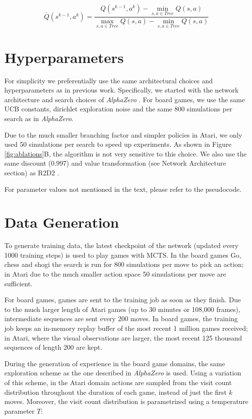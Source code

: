 \documentclass{article}
\newcommand{\alphazero}{\emph{AlphaZero}}
\begin{document}
\begin{appendices}
\begin{equation}
\overline{Q}(s^{k-1}, a^k) = \frac{Q(s^{k-1}, a^k) - \min_{s, a \in Tree}Q(s, a)}{\max_{s,a \in Tree} Q(s, a) - \min_{s,a \in Tree} Q(s, a)}
\end{equation}

\section{Hyperparameters}

For simplicity we preferentially use the same architectural choices and hyperparameters as in previous work. Specifically, we started with the network architecture and search choices of \alphazero{} \cite{Silver18AZ}. For board games, we use the same UCB constants, dirichlet exploration noise and the same 800 simulations per search as in \alphazero{}.

Due to the much smaller branching factor and simpler policies in Atari, we only used 50 simulations per search to speed up experiments. As shown in Figure \ref{fig:ablations}B, the algorithm is not very sensitive to this choice. We also use the same discount ($0.997$) and value transformation (see Network Architecture section) as R2D2 \cite{r2d2}.

For parameter values not mentioned in the text, please refer to the pseudocode.

\section{Data Generation}

To generate training data, the latest checkpoint of the network (updated every 1000 training steps) is used to play games with MCTS. In the board games Go, chess and shogi the search is run for 800 simulations per move to pick an action; in Atari due to the much smaller action space 50 simulations per move are sufficient.

For board games, games are sent to the training job as soon as they finish. Due to the much larger length of Atari games (up to 30 minutes or 108,000 frames), intermediate sequences are sent every 200 moves. In board games, the training job keeps an in-memory replay buffer of the most recent 1 million games received; in Atari, where the visual observations are larger, the most recent 125 thousand sequences of length 200 are kept.

During the generation of experience in the board game domains, the same exploration scheme as the one described in
\alphazero{} \cite{Silver18AZ} is used. Using a variation of this scheme, in the Atari domain actions are sampled from the visit count distribution throughout the duration of each game, instead of just the first $k$ moves. Moreover, the visit count distribution is parametrized using a temperature parameter $T$:


\end{appendices}
\end{document}
